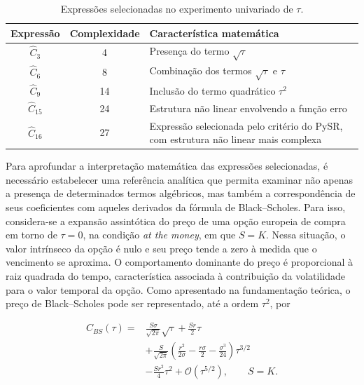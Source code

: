 \begin{table}[htbp]
\centering
\caption{Expressões selecionadas no experimento
univariado de $\tau$.}
\label{tab:tau_expressoes}
\begin{tabular}{c c p{8cm}}
\hline
\textbf{Expressão} &
\textbf{Complexidade} &
\textbf{Característica matemática} \\
\hline
$\hat{C}_3$ & 4 &
Presença do termo $\sqrt{\tau}$ \\

$\hat{C}_6$ & 8 &
Combinação dos termos $\sqrt{\tau}$ e $\tau$ \\

$\hat{C}_9$ & 14 &
Inclusão do termo quadrático $\tau^2$ \\

$\hat{C}_{15}$ & 24 &
Estrutura não linear envolvendo a função erro \\

$\hat{C}_{16}$ & 27 &
Expressão selecionada pelo critério do PySR,
com estrutura não linear mais complexa \\
\hline
\end{tabular}

\end{table}
Para aprofundar a interpretação matemática das expressões selecionadas, é necessário estabelecer uma referência analítica que permita examinar não apenas a presença de determinados termos algébricos, mas também a correspondência de seus coeficientes com aqueles derivados da fórmula de Black--Scholes. Para isso, considera-se a expansão assintótica do preço de uma opção europeia de compra em torno de $\tau=0$, na condição \textit{at the money}, em que $S=K$. Nessa situação, o valor intrínseco da opção é nulo e seu preço tende a zero à medida que o vencimento se aproxima. O comportamento dominante do preço é proporcional à raiz quadrada do tempo, característica associada à contribuição da volatilidade para o valor temporal da opção. Como apresentado na fundamentação teórica, o preço de Black--Scholes pode ser representado, até a ordem $\tau^2$, por

\begin{equation}
\label{eq:tau_teorico}
\begin{aligned}
C_{BS}(\tau) ={}&
\frac{S\sigma}{\sqrt{2\pi}}\sqrt{\tau}
+\frac{Sr}{2}\tau\\
&+\frac{S}{\sqrt{2\pi}}
\left(
\frac{r^2}{2\sigma}
-\frac{r\sigma}{2}
-\frac{\sigma^3}{24}
\right)\tau^{3/2}\\
&-\frac{Sr^2}{4}\tau^2
+\mathcal{O}(\tau^{5/2}),
\qquad S=K.
\end{aligned}
\end{equation}

